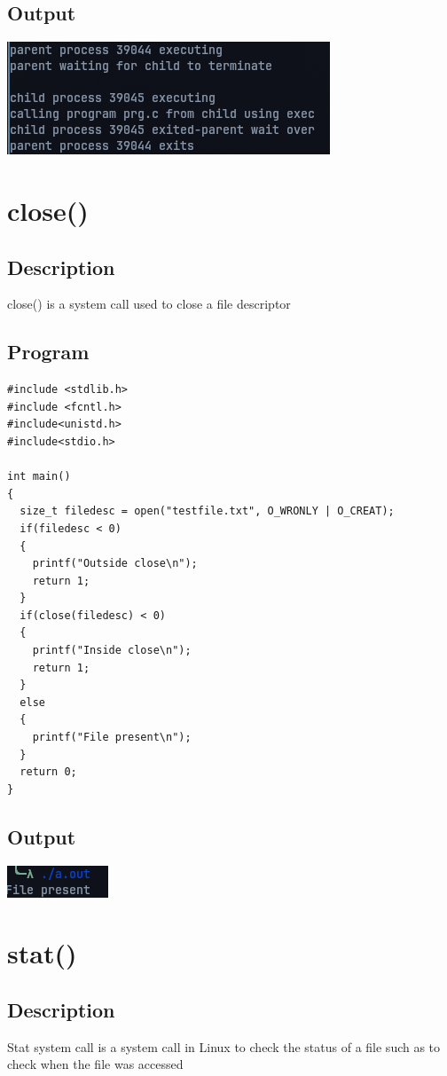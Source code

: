 \subsection{Output}
\includegraphics[]{Cycle_1//Outputs/wait.png}


\section{close()}
\subsection{Description}
close() is a system call used to close a file descriptor
\subsection{Program}
\begin{lstlisting}[label={list:c_program:exit}]
#include <stdlib.h>
#include <fcntl.h>
#include<unistd.h>
#include<stdio.h>

int main()
{
  size_t filedesc = open("testfile.txt", O_WRONLY | O_CREAT);
  if(filedesc < 0)
  {
    printf("Outside close\n");
    return 1;
  }
  if(close(filedesc) < 0)
  {
    printf("Inside close\n");
    return 1;
  }
  else
  {
    printf("File present\n");
  }
  return 0;
}
\end{lstlisting}

\subsection{Output}
\includegraphics[width=0.5\linewidth]{Cycle_1//Outputs/close.png}

\section{stat()}
\subsection{Description}
Stat system call is a system call in Linux to check the status of a file such as to
check when the file was accessed
